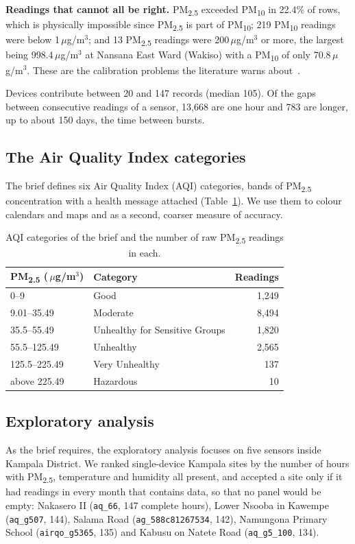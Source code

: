 \documentclass{ieeeaccess}
\newcommand{\ugm}{\,$\mu$g/m$^{3}$}
\newcommand{\pmtwo}{PM\textsubscript{2.5}}
\newcommand{\pmten}{PM\textsubscript{10}}
\begin{document}
\textbf{Readings that cannot all be right.} \pmtwo{} exceeded \pmten{} in 22.4\% of rows, which is physically impossible since \pmtwo{} is part of \pmten{}; 219 \pmten{} readings were below 1\ugm{}; and 13 \pmtwo{} readings were 200\ugm{} or more, the largest being 998.4\ugm{} at Nansana East Ward (Wakiso) with a \pmten{} of only 70.8\ugm{}. These are the calibration problems the literature warns about~\cite{adong2022,lsoto2026}.

Devices contribute between 20 and 147 records (median 105). Of the gaps between consecutive readings of a sensor, 13{,}668 are one hour and 783 are longer, up to about 150 days, the time between bursts.

\subsection{The Air Quality Index categories}
The brief defines six Air Quality Index (AQI) categories, bands of \pmtwo{} concentration with a health message attached (Table~\ref{tab:aqi}). We use them to colour calendars and maps and as a second, coarser measure of accuracy.

\begin{table}[t]
\caption{AQI categories of the brief and the number of raw \pmtwo{} readings in each.}
\label{tab:aqi}
\centering
\begin{tabular}{llr}
\toprule
\pmtwo{} (\ugm) & Category & Readings \\
\midrule
0--9 & Good & 1{,}249 \\
9.01--35.49 & Moderate & 8{,}494 \\
35.5--55.49 & Unhealthy for Sensitive Groups & 1{,}820 \\
55.5--125.49 & Unhealthy & 2{,}565 \\
125.5--225.49 & Very Unhealthy & 137 \\
above 225.49 & Hazardous & 10 \\
\bottomrule
\end{tabular}
\end{table}

\subsection{Exploratory analysis}
\label{sec:eda}
As the brief requires, the exploratory analysis focuses on five sensors inside Kampala District. We ranked single-device Kampala sites by the number of hours with \pmtwo{}, temperature and humidity all present, and accepted a site only if it had readings in every month that contains data, so that no panel would be empty: Nakasero II (\texttt{aq\_66}, 147 complete hours), Lower Nsooba in Kawempe (\texttt{aq\_g507}, 144), Salama Road (\texttt{ag\_588c81267534}, 142), Namungona Primary School (\texttt{airqo\_g5365}, 135) and Kabusu on Natete Road (\texttt{aq\_g5\_100}, 134).
\end{document}
